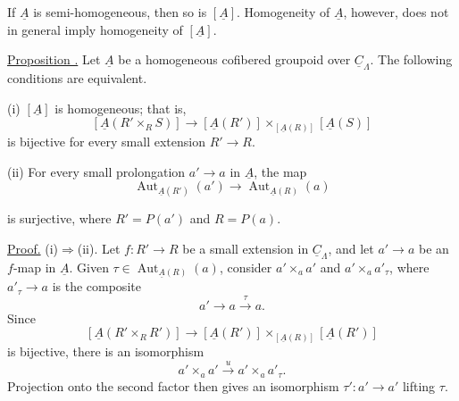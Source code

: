 If $\underline A$ is semi-homogeneous, then so is $[\underline A]$.
Homogeneity of $\underline A$, however, does not in general imply
homogeneity of $[\underline A]$.

\underline{Proposition .} Let $\underline A$ be a homogeneous
cofibered groupoid over $\underline C_\Lambda$. The following
conditions are equivalent.

(i) $[\underline A]$ is homogeneous; that is,
\[
 [\underline A(R'\times_RS)]\longrightarrow
 [\underline A(R')]
 \times_{[\underline A(R)]}[\underline A(S)]
\]
is bijective for every small extension $R'\longrightarrow R$.

(ii) For every small prolongation $a'\longrightarrow a$ in
$\underline A$, the map
\[
 \operatorname{Aut}_{\underline A(R')}(a')
 \longrightarrow
 \operatorname{Aut}_{\underline A(R)}(a)
\]


is surjective, where $R'=P(a')$ and $R=P(a)$.

\underline{Proof.} (i)$\Rightarrow$(ii). Let
$f:R'\longrightarrow R$ be a small extension in
$\underline C_\Lambda$, and let $a'\longrightarrow a$ be an
$f$-map in $\underline A$. Given
$\tau\in\operatorname{Aut}_{\underline A(R)}(a)$, consider
$a'\times_a a'$ and $a'\times_a a'_\tau$, where
$a'_\tau\longrightarrow a$ is the composite
\[
 a'\longrightarrow a\xrightarrow{\ \tau\ }a.
\]
Since
\[
 [\underline A(R'\times_RR')]
 \longrightarrow
 [\underline A(R')]
 \times_{[\underline A(R)]}[\underline A(R')]
\]
is bijective, there is an isomorphism
\[
 a'\times_a a'\xrightarrow{\ u\ }a'\times_a a'_\tau.
\]
Projection onto the second factor then gives an isomorphism
$\tau':a'\longrightarrow a'$ lifting $\tau$.

